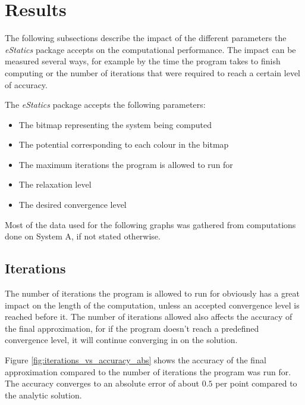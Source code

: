 
\section{Results}
The following subsections describe the impact of the different parameters the \emph{eStatics} package accepts on the computational performance. The impact can be measured several ways, for example by the time the program takes to finish computing or the number of iterations that were required to reach a certain level of accuracy. 

The \emph{eStatics} package accepts the following parameters:
\begin{itemize}
	\item The bitmap representing the system being computed
	\item The potential corresponding to each colour in the bitmap
	\item The maximum iterations the program is allowed to run for
	\item The relaxation level
	\item The desired convergence level
\end{itemize}

Most of the data used for the following graphs was gathered from computations done on System A, if not stated otherwise.

\subsection{Iterations}
The number of iterations the program is allowed to run for obviously has a great impact on the length of the computation, unless an accepted convergence level is reached before it. The number of iterations allowed also affects the accuracy of the final approximation, for if the program doesn't reach a predefined convergence level, it will continue converging in on the solution. 

Figure \ref{fig:iterations_vs_accuracy_abs} shows the accuracy of the final approximation compared to the number of iterations the program was run for. The accuracy converges to an absolute error of about $0.5$ per point compared to the analytic solution.


